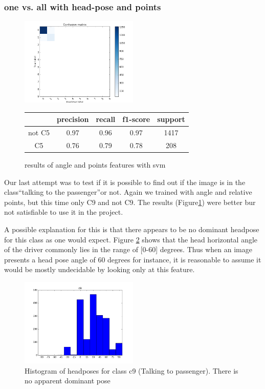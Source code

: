 \documentclass[10pt,twocolumn,letterpaper]{article}
\begin{document}
\subsubsection{one vs. all with head-pose and points}
\begin{figure}[h]
	\centering
	\includegraphics[width=0.5\textwidth]{c5ornot.png}\hspace{0.01\textwidth}
	\begin{tabular}{c||c|c|c|c}
	  & precision&recall&f1-score&support\\	\hline
	  not C5&0.97&0.96&0.97&1417\\
	  C5&0.76&0.79&0.78&208
	\end{tabular}
	\caption{results of angle and points features with svm}
	\label{C5ornot}
	\end{figure}

Our last attempt was to test if it is possible to find out if the image is in the class``talking to the passenger''or not. Again we trained with angle and relative points, but this time only C9 and not C9. The results (Figure\ref{C5ornot}) were better bur not satisfiable to use it in the project.

A possible explanation for this is that there appears to be no dominant headpose for this class as one would expect. Figure \ref{headpose_histogram_c9} shows that the head horizontal angle of the driver commonly lies in the range of [0-60] degrees. Thus when an image presents a head pose angle of 60 degrees for instance, it is reasonable to assume it would be mostly undecidable by looking only at this feature.

\begin{figure}[h]
	\centering
	\includegraphics[width=0.5\textwidth]{headpose_evaluation_c9}
	\caption{Histogram of headposes for class c9 (Talking to passenger). There is no apparent dominant pose}
	\label{headpose_histogram_c9}
\end{figure}
\end{document}
